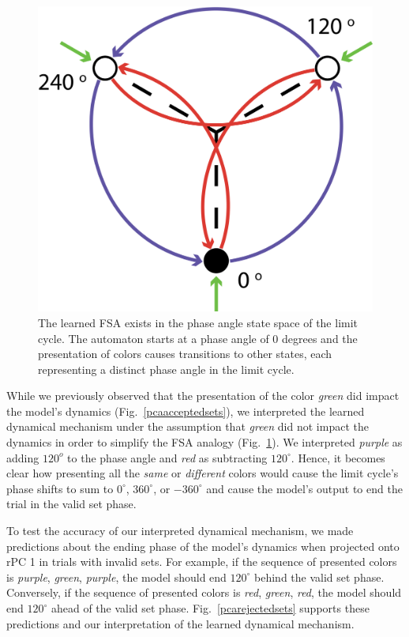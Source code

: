 \documentclass[conference]{IEEEtran}
\begin{document}
\begin{figure}[htbp]
\centerline{\includegraphics[scale=0.125]{resulting_FSA.png}}
\caption{The learned FSA exists in the phase angle state space of the limit cycle. The automaton starts at a phase angle of $0$ degrees and the presentation of colors causes transitions to other states, each representing a distinct phase angle in the limit cycle.}
\label{resultingfsa}
\end{figure}

While we previously observed that the presentation of the color \textit{green} did impact the model's dynamics (Fig.~\ref{pcaacceptedsets}), we interpreted the learned dynamical mechanism under the assumption that \textit{green} did not impact the dynamics in order to simplify the FSA analogy (Fig.~\ref{resultingfsa}). We interpreted \textit{purple} as adding $120^o$ to the phase angle and \textit{red} as subtracting $120^{\circ}$. Hence, it becomes clear how presenting all the \textit{same} or \textit{different} colors would cause the limit cycle's phase shifts to sum to $0^{\circ}$, $360^{\circ}$, or $-360^{\circ}$ and cause the model's output to end the trial in the valid set phase.

To test the accuracy of our interpreted dynamical mechanism, we made predictions about the ending phase of the model's dynamics when projected onto rPC 1 in trials with invalid sets. For example, if the sequence of presented colors is \textit{purple}, \textit{green}, \textit{purple}, the model should end $120^{\circ}$ behind the valid set phase. Conversely, if the sequence of presented colors is \textit{red}, \textit{green}, \textit{red}, the model should end $120^{\circ}$ ahead of the valid set phase. Fig.~\ref{pcarejectedsets} supports these predictions and our interpretation of the learned dynamical mechanism.
\end{document}
